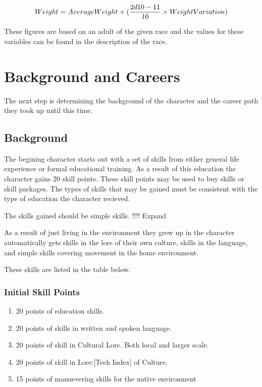 \[ Weight = {Average Weight} + ( {{2d10 - 11} \over {10}} \times 
{Weight Variation})
\]

These figures are based on an adult of the given race and the values
for these variables can be found in the description of the race.

\clearpage
\section{Background and Careers}

The next step is determining the background of the character
and the career path they took up until this time.

\subsection{Background}

The begining character starts out with a set of skills from either 
general life experience or formal educational training. As a result of 
this education the character gains 20 skill points. These skill points 
may be used to buy skills or skill packages. The types of skills that may
be gained must be consistent with the type of education the character 
recieved. 

The skills gained should be simple skills. !!!! Expand

As a result of just living in the environment they grew up in 
the character automatically gets skills in the lore of 
their own culture, skills in the language, and simple skills 
covering movement in the home environment.

These skills are listed in the table below.

\subsubsection{Initial Skill Points}
\begin{enumerate}
	\item 20 points of education skills.
	\item 20 points of skills in written and spoken language.
	\item 20 points of skill in Cultural Lore. Both local and larger scale.
	\item 20 points of skill in Lore:[Tech Index] of Culture.
	\item 15 points of manuevering skills for the native environment
\end{enumerate}

